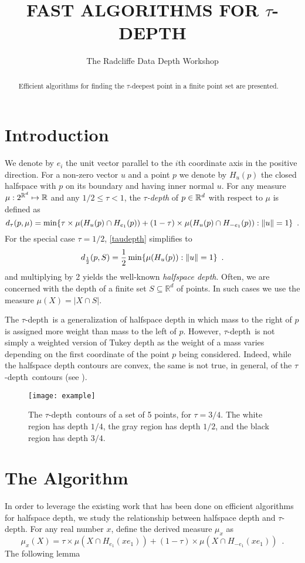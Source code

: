 \documentclass[lotsofwhite]{patmorin}
\title{\MakeUppercase{Fast Algorithms for $\tau$-Depth}}
\author{The Radcliffe Data Depth Workshop}
\date{}
\newcommand{\taudepth}{$\tau$-depth}
\newcommand{\Taudepth}{The $\tau$-depth}
\newcommand{\tdepth}{d_\tau}
\newcommand{\tukdepth}{d_{\frac{1}{2}}}
\begin{document}
\maketitle
\begin{abstract}
Efficient algorithms for finding the $\tau$-deepest point
in a finite point set are presented.
\end{abstract}

\section{Introduction}

We denote
by $e_i$ the unit vector parallel to the $i$th coordinate axis in the
positive direction.
For a non-zero vector $u$ and a point $p$ we denote by $H_u(p)$ the
closed halfspace with $p$ on its boundary and having inner normal $u$.
For any measure $\mu:2^{\mathbb{R}^d}\mapsto\mathbb{R}$ and any $1/2\le\tau < 1$,
the \emph{\taudepth} of $p\in\mathbb{R}^d$ with respect to $\mu$ is defined as 
\begin{equation}
    \tdepth(p,\mu) = \min\{ \tau \times \mu(H_u(p)\cap H_{e_1}(p)) 
           + (1-\tau)\times \mu(H_u(p)\cap H_{-e_1}(p)): \|u\|=1\} \enspace .
    \eqlabel{taudepth}
\end{equation}
For the special case $\tau=1/2$, \eqref{taudepth} simplifies to
\[
    \tukdepth(p,S) = \frac{1}{2}\min\{ \mu(H_u(p)) : \|u\|=1\} \enspace .
    \eqlabel{tukdepth}
\]
and multiplying by 2 yields the well-known \emph{halfspace depth}.
Often, we are concerned with the depth of a finite set
$S\subseteq\mathbb{R}^d$ of points.  In such cases we use the measure
$\mu(X)=|X\cap S|$.

\Taudepth\ is a generalization of halfspace depth in which mass to the
right of $p$ is assigned more weight than mass to the left of $p$.
However, \taudepth\ is not simply a weighted version of Tukey depth as
the weight of a mass varies depending on the first coordinate of the
point $p$ being considered.  Indeed, while the halfspace depth
contours are convex, the same is not true, in general, of the
\taudepth\ contours (see ).

\begin{figure}
\begin{center} \texttt{[image: example]} \end{center}
\caption{The \taudepth\ contours of a set of 5 points, for $\tau=3/4$. The
white region has depth $1/4$, the gray region has depth $1/2$, and the
black region has depth $3/4$.}
\end{figure}

\section{The Algorithm}

In order to leverage the existing work that has been done on efficient
algorithms for halfspace depth, we study the relationship between
halfspace depth and \taudepth.  For any real number $x$, define the
derived measure $\mu_x$ as
\[
           \mu_x(X) = \tau\times \mu(X\cap H_{e_1}(xe_1)) 
               + (1-\tau)\times \mu(X\cap H_{-e_1}(xe_1)) \enspace .
\]
The following lemma
\end{document}
